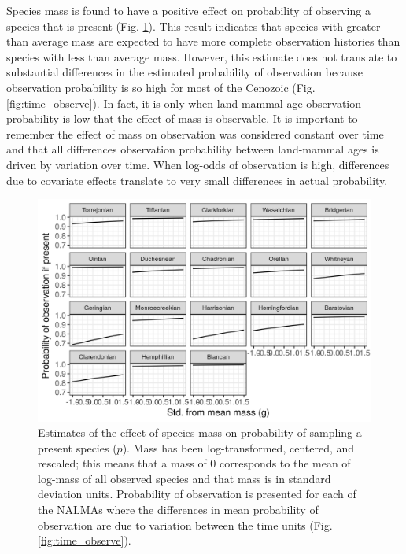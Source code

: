 \documentclass[12pt,letterpaper]{article}
\begin{document}
Species mass is found to have a positive effect on probability of observing a species that is present (Fig. \ref{fig:mass_observe}). This result indicates that species with greater than average mass are expected to have more complete observation histories than species with less than average mass. However, this estimate does not translate to substantial differences in the estimated probability of observation because observation probability is so high for most of the Cenozoic (Fig. \ref{fig:time_observe}). In fact, it is only when land-mammal age observation probability is low that the effect of mass is observable. It is important to remember the effect of mass on observation was considered constant over time and that all differences observation probability between land-mammal ages is driven by variation over time. When log-odds of observation is high, differences due to covariate effects translate to very small differences in actual probability. %
\begin{figure}[ht]
  \includegraphics[width=\textwidth,height=0.4\textheight,keepaspectratio=true]{figure/mass_on_pres_bd}
  \caption[Estimates of the effect of mass on observation probability]{Estimates of the effect of species mass on probability of sampling a present species (\(p\)). Mass has been log-transformed, centered, and rescaled; this means that a mass of 0 corresponds to the mean of log-mass of all observed species and that mass is in standard deviation units. Probability of observation is presented for each of the NALMAs where the differences in mean probability of observation are due to variation between the time units (Fig. \ref{fig:time_observe}).}
  \label{fig:mass_observe}
\end{figure}
\end{document}
